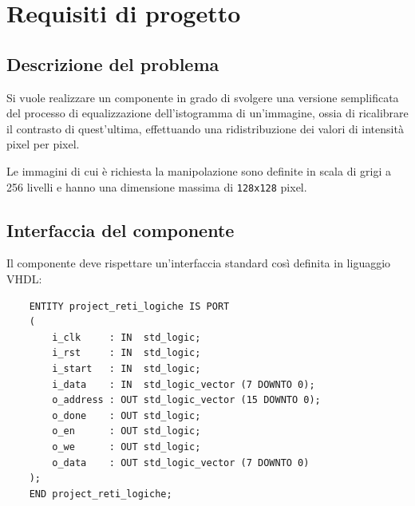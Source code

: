 \documentclass{article}
\begin{document}
\section{Requisiti di progetto} %
\subsection{Descrizione del problema} %
Si vuole realizzare un componente in grado di svolgere una versione semplificata del processo di equalizzazione dell’istogramma di un’immagine, ossia di ricalibrare il contrasto di quest’ultima,
effettuando una ridistribuzione dei valori di intensità pixel per pixel. \par
Le immagini di cui è richiesta la manipolazione sono definite in scala di grigi a 256 livelli e hanno una dimensione massima di \texttt{128x128} pixel.
\vspace{0,2cm} %

\subsection{Interfaccia del componente} %
Il componente deve rispettare un’interfaccia standard così definita in liguaggio VHDL:

\begin{verbatim}
    ENTITY project_reti_logiche IS PORT
	(
		i_clk     : IN  std_logic;
		i_rst     : IN  std_logic; 
		i_start   : IN  std_logic; 
		i_data    : IN  std_logic_vector (7 DOWNTO 0);
		o_address : OUT std_logic_vector (15 DOWNTO 0);
		o_done    : OUT std_logic; 
		o_en      : OUT std_logic;
		o_we      : OUT std_logic;
		o_data    : OUT std_logic_vector (7 DOWNTO 0) 
	);
    END project_reti_logiche;
\end{verbatim}
\vspace{0,2cm} %
\end{document}
